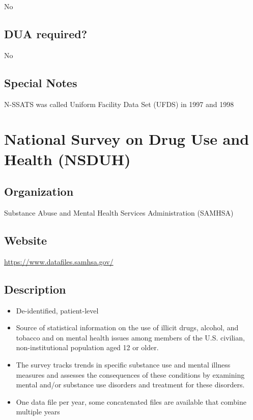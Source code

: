 \documentclass[
]{book}
\providecommand{\tightlist}{%
  \setlength{\itemsep}{0pt}\setlength{\parskip}{0pt}}
\begin{document}
No

\hypertarget{dua-required-64}{%
\section{DUA required?}\label{dua-required-64}}

No

\hypertarget{special-notes-64}{%
\section{Special Notes}\label{special-notes-64}}

N-SSATS was called Uniform Facility Data Set (UFDS) in 1997 and 1998

\mainmatter

\hypertarget{national-survey-on-drug-use-and-health-nsduh}{%
\chapter{National Survey on Drug Use and Health (NSDUH)}\label{national-survey-on-drug-use-and-health-nsduh}}

\hypertarget{organization-65}{%
\section{Organization}\label{organization-65}}

Substance Abuse and Mental Health Services Administration (SAMHSA)

\hypertarget{website-65}{%
\section{Website}\label{website-65}}

\url{https://www.datafiles.samhsa.gov/}

\hypertarget{description-65}{%
\section{Description}\label{description-65}}

\begin{itemize}
\tightlist
\item
  De-identified, patient-level
\item
  Source of statistical information on the use of illicit drugs, alcohol, and tobacco and on mental health issues among members of the U.S. civilian, non-institutional population aged 12 or older.
\item
  The survey tracks trends in specific substance use and mental illness measures and assesses the consequences of these conditions by examining mental and/or substance use disorders and treatment for these disorders.
\item
  One data file per year, some concatenated files are available that combine multiple years
\end{itemize}
\end{document}
